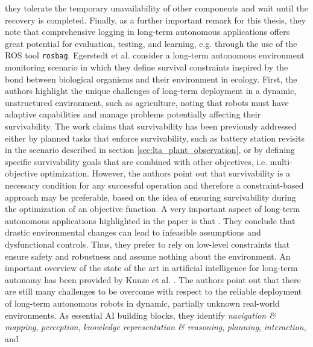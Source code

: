 \documentclass[english, master, utf8]{base/thesis_KBS}
\newcommand{\code}[1]{\colorbox{light-gray}{\texttt{#1}}}
\begin{document}
they tolerate the temporary unavailability of other components and wait until the recovery is completed. Finally, as a further important remark for this thesis, they note that
comprehensive logging in long-term autonomous applications offers great potential for evaluation, testing, and learning, e.g. through the use of the ROS tool \code{rosbag}.\newline
Egerstedt et al. \cite{Egerstedt:2018} consider a long-term autonomous environment monitoring scenario in which they define survival constraints inspired by the bond between
biological organisms and their environment in ecology. First, the authors highlight the unique challenges of long-term deployment in a dynamic, unstructured environment, such as
agriculture, noting that robots must have adaptive capabilities and manage problems potentially affecting their survivability.  \cite{Egerstedt:2018} The work claims that survivability has been
previously addressed either by planned tasks that enforce survivability, such as battery station revisits in the scenario described in section \ref{sec:lta_plant_observation},
or by defining specific survivability goals that are combined with other objectives, i.e. multi-objective optimization. However, the authors point out that survivability is a
necessary condition for any successful operation and therefore a constraint-based approach may be preferable, based on the idea of ensuring survivability during the optimization
of an objective function. A very important aspect of long-term autonomous applications highlighted in the paper is that . \cite{Egerstedt:2018} They conclude that drastic environmental changes can lead to infeasible assumptions and
dysfunctional controls. Thus, they prefer to rely on low-level constraints that ensure safety and robustness and assume nothing about the environment.\newline
An important overview of the state of the art in artificial intelligence for long-term autonomy has been provided by Kunze et al. \cite{Kunze:2018}. The authors point out that there
are still many challenges to be overcome with respect to the reliable deployment of long-term autonomous robots in dynamic, partially unknown real-world environments. As essential
AI building blocks, they identify \textit{navigation \& mapping}, \textit{perception}, \textit{knowledge representation \& reasoning}, \textit{planning}, \textit{interaction}, and
\end{document}
